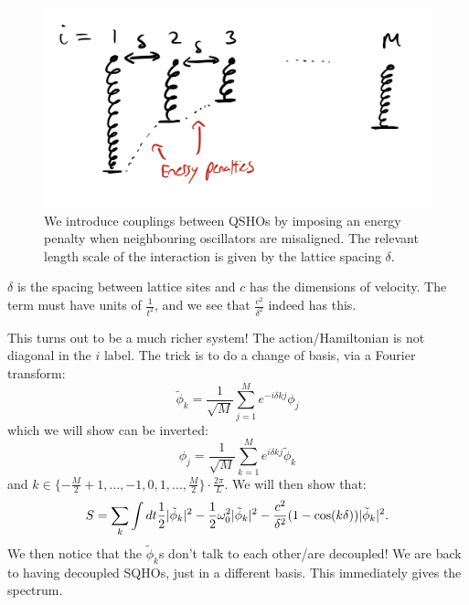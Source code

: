\begin{figure}[htbp]
    \centering
    \includegraphics[scale=0.4]{Lectures/Figures/coupled_qsho_chain.png}
    \caption{We introduce couplings between QSHOs by imposing an energy penalty when neighbouring oscillators are misaligned. The relevant length scale of the interaction is given by the lattice spacing $\delta$.}
    \label{fig:coupled_qsho_chain}
\end{figure}

$\delta$ is the spacing between lattice sites and $c$ has the dimensions of velocity. The term must have units of $\frac{1}{t^2}$, and we see that $\frac{c^2}{\delta^2}$ indeed has this.

This turns out to be a much richer system! The action/Hamiltonian is not diagonal in the $i$ label. The trick is to do a change of basis, via a Fourier transform:
\begin{equation}
    \tilde{\phi}_k = \frac{1}{\sqrt{M}}\sum_{j=1}^Me^{-i\delta k j}\phi_j
\end{equation}
which we will show can be inverted:
\begin{equation}
    \phi_j = \frac{1}{\sqrt{M}}\sum_{k=1}^Me^{i\delta k j}\tilde{\phi}_k
\end{equation}
and $k \in \{-\frac{M}{2} + 1, \ldots, -1, 0, 1, \ldots, \frac{M}{2}\} \cdot \frac{2\pi}{L}$. We will then show that:
\begin{equation}
    S = \sum_k \int dt \frac{1}{2}\lvert \tilde{\phi}_k \rvert^2 - \frac{1}{2}\omega_0^2\lvert \tilde{\phi}_k \rvert^2 - \frac{c^2}{\delta^2}(1 - \cos(k\delta))\lvert \tilde{\phi}_k \rvert^2.
\end{equation}
We then notice that the $\tilde{\phi}_k$s don't talk to each other/are decoupled! We are back to having decoupled SQHOs, just in a different basis. This immediately gives the spectrum.